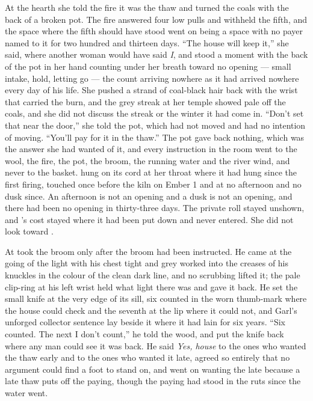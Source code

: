 At the hearth she told the fire it was the thaw and turned the coals with the back of a broken pot. The fire answered four low pulls and withheld the fifth, and the space where the fifth should have stood went on being a space with no payer named to it for two hundred and thirteen days. “The house will keep it,” she said, where another woman would have said \emph{I}, and stood a moment with the back of the pot in her hand counting under her breath toward no opening --- small intake, hold, letting go --- the count arriving nowhere as it had arrived nowhere every day of his life. She pushed a strand of coal-black hair back with the wrist that carried the burn, and the grey streak at her temple showed pale off the coals, and she did not discuss the streak or the winter it had come in. “Don't set that near the door,” she told the pot, which had not moved and had no intention of moving. “You'll pay for it in the thaw.” The pot gave back nothing, which was the answer she had wanted of it, and every instruction in the room went to the wool, the fire, the pot, the broom, the running water and the river wind, and never to the basket.  hung on its cord at her throat where it had hung since the first firing, touched once before the kiln on Ember 1 and at no afternoon and no dusk since. An afternoon is not an opening and a dusk is not an opening, and there had been no opening in thirty-three days. The private roll stayed unshown, and 's cost stayed where it had been put down and never entered. She did not look toward .

\scenebreak

At   took the broom only after the broom had been instructed. He came at the going of the light with his chest tight and grey  worked into the creases of his knuckles in the colour of the clean dark line, and no scrubbing lifted it; the pale clip-ring at his left wrist held what light there was and gave it back. He set the small knife at the very edge of its sill, six counted in the worn thumb-mark where the house could check and the seventh at the lip where it could not, and Garl's unforged collector sentence lay beside it where it had lain for six years. “Six counted. The next I don't count,” he told the wood, and put the knife back where any man could see it was back. He said \emph{Yes, house} to the ones who wanted the thaw early and to the ones who wanted it late, agreed so entirely that no argument could find a foot to stand on, and went on wanting the late because a late thaw puts off the paying, though the paying had stood in the ruts since the water went.

